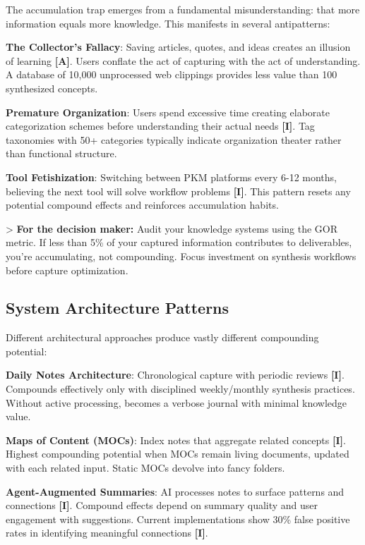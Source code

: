 \documentclass[a4paper,11pt]{article}
\newcommand{\ilabel}{\textbf{\textcolor{icolor}{[I]}}}
\newcommand{\alabel}{\textbf{\textcolor{acolor}{[A]}}}
\begin{document}
The accumulation trap emerges from a fundamental misunderstanding: that more information equals more knowledge. This manifests in several antipatterns:


\textbf{The Collector's Fallacy}: Saving articles, quotes, and ideas creates an illusion of learning \alabel{}. Users conflate the act of capturing with the act of understanding. A database of 10,000 unprocessed web clippings provides less value than 100 synthesized concepts.


\textbf{Premature Organization}: Users spend excessive time creating elaborate categorization schemes before understanding their actual needs \ilabel{}. Tag taxonomies with 50+ categories typically indicate organization theater rather than functional structure.


\textbf{Tool Fetishization}: Switching between PKM platforms every 6-12 months, believing the next tool will solve workflow problems \ilabel{}. This pattern resets any potential compound effects and reinforces accumulation habits.


> \textbf{For the decision maker:} Audit your knowledge systems using the GOR metric. If less than 5\% of your captured information contributes to deliverables, you're accumulating, not compounding. Focus investment on synthesis workflows before capture optimization.


\subsection{System Architecture Patterns}

Different architectural approaches produce vastly different compounding potential:


\textbf{Daily Notes Architecture}: Chronological capture with periodic reviews \ilabel{}. Compounds effectively only with disciplined weekly/monthly synthesis practices. Without active processing, becomes a verbose journal with minimal knowledge value.


\textbf{Maps of Content (MOCs)}: Index notes that aggregate related concepts \ilabel{}. Highest compounding potential when MOCs remain living documents, updated with each related input. Static MOCs devolve into fancy folders.


\textbf{Agent-Augmented Summaries}: AI processes notes to surface patterns and connections \ilabel{}. Compound effects depend on summary quality and user engagement with suggestions. Current implementations show 30\% false positive rates in identifying meaningful connections \ilabel{}.
\end{document}
